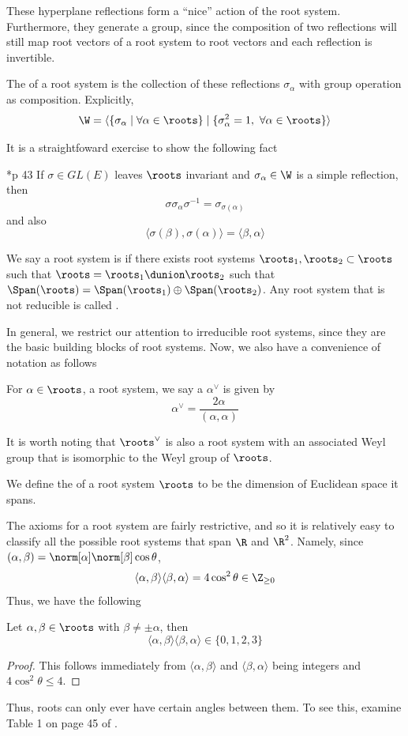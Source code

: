 \documentclass[11pt,leqno,oneside]{amsart}
\numberwithin{thm}{section}
\begin{document}
These hyperplane reflections form a ``nice''
action of the root system. Furthermore, 
they generate a group, since the composition of two reflections will
still map root vectors of a root system to root vectors and each reflection is invertible.
\begin{defn}
  The  of a root system is the collection of these
  reflections $\sigma_\alpha$ with group operation as
  composition. Explicitly, \[
    \W = \langle \{\sigma_\alpha \mid \forall \alpha \in \roots\} \mid
    \{\sigma_\alpha^2 = 1, \ \forall \alpha \in \roots\} \rangle
  \]
\end{defn}
It is a straightfoward exercise to show the following fact
\begin{lem}\label{weyl-gp-conj}
  \cite{humph}*{p 43} If $\sigma \in GL(E)$ leaves \(\roots\) invariant and $\sigma_\alpha \in
  \W$ is a simple reflection, then \[
    \sigma \sigma_\alpha \sigma^{-1} = \sigma_{\sigma(\alpha)}
  \]
  and also \[
    \langle \sigma(\beta), \sigma(\alpha) \rangle = \langle \beta, \alpha \rangle
  \]
\end{lem}
\begin{defn}
  We say a root system is  if there exists root systems
  \(\roots_1, \roots_2 \subset \roots\) such that \(\roots = \roots_1 \dunion
  \roots_2\) such that \(\Span(\roots) = \Span(\roots_1) \oplus
  \Span(\roots_2)\). Any root system that is not reducible is called
  . 
\end{defn}
In general, we restrict our attention to irreducible root systems,
since they are the basic building blocks of root systems.
Now, we also have a convenience of notation as follows
\begin{defn}
   For $\alpha \in \roots$, a root system, we say a 
   $\alpha^\vee$ is given by \[ 
    \alpha^\vee = \frac{2 \alpha}{(\alpha, \alpha)}
  \]
\end{defn}
It is worth noting that $\roots^\vee$ is also a root system with an
associated Weyl group that is isomorphic to the Weyl group of $\roots$.
\begin{defn}
  We define the  of a root system $\roots$ to be the dimension
  of Euclidean space it spans.
\end{defn}
The axioms for a root system are fairly restrictive, and so it is
relatively easy to classify all the possible root systems that span
$\R$ and $\R^2$. Namely, since \((\alpha,\beta) =
\norm[\alpha]\norm[\beta] \cos \theta\), \[
  \langle \alpha,\beta \rangle \langle \beta,\alpha \rangle = 4 \cos^2
  \theta \in \Z_{\geq 0}
\]
Thus, we have the following
\begin{lem}\label{possible-values-of-inner-product}
  Let \(\alpha,\beta \in \roots\) with \(\beta \neq \pm \alpha\),
  then \[ 
    \langle \alpha,\beta \rangle \langle \beta,\alpha \rangle \in \{0,1,2,3\}
  \]
\end{lem}
\begin{proof}
  This follows immediately from \(\langle \alpha,\beta \rangle\) and
  \(\langle \beta,\alpha \rangle\) being integers and \(4 \cos^2
  \theta \leq 4\).
\end{proof}
Thus, roots can only ever have certain angles
between them. To see this, examine Table 1 on page 45 of
\cite{humph}. 
\end{document}
